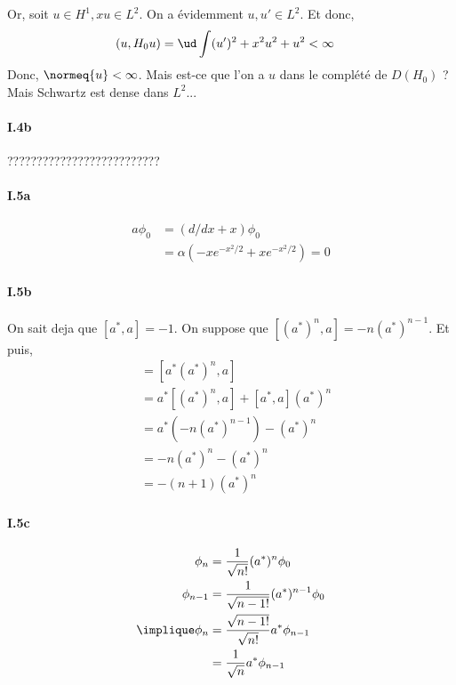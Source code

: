 Or, soit $u \in H^1, xu \in L^2$. On a évidemment $u, u' \in L^2$.
Et donc,
\begin{align}
    (u, H_0 u) &= \ud \int (u')^2 + x^2u^2 + u^2 < \infty
\end{align}
%
Donc, $\normeq{u} < \infty$. Mais est-ce que l'on a $u$ dans
le complété de $D(H_0)$ ? Mais Schwartz est dense dans $L^2$...

\paragraph{I.4b}

??????????????????????????

\paragraph{I.5a}

\begin{align}
    a \phi_0 &= (d/dx + x) \phi_0 \\
    &= \alpha ( -x e^{-x^2 / 2} + x e^{-x^2 / 2} ) = 0
\end{align}

\paragraph{I.5b}

On sait deja que $[a^*, a] = -1$. On suppose que
$[(a^*)^{n}, a] = -n(a^*)^{n-1}$. Et puis,
\begin{align}
[(a^*)^{n+1}, a]
    &= [a^* (a^*)^{n}, a] \\
    &= a^* [(a^*)^{n}, a] + [a^*, a] (a^*)^{n} \\
    &= a^* (-n(a^*)^{n-1}) - (a^*)^{n} \\
    &= -n(a^*)^n - (a^*)^{n} \\
    &= -(n+1) (a^*)^n
\end{align}

\paragraph{I.5c}

\begin{align}
    \phi_n &= \frac{1}{\sqrt{n!}} (a^*)^n \phi_0 \\
    \phi_{n-1} &= \frac{1}{\sqrt{{n-1}!}} (a^*)^{n-1} \phi_0 \\
    \implique \phi_n &= \frac{\sqrt{{n-1}!}}{\sqrt{n!}} a^* \phi_{n-1} \\
    &= \frac{1}{\sqrt{n}} a^* \phi_{n-1}
\end{align}


